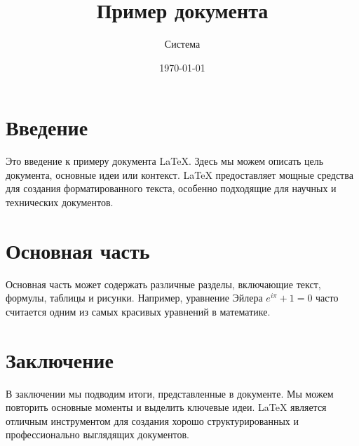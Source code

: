 \documentclass{article}
\title{Пример документа}
\author{Система}
\date{\today}
\begin{document}
\maketitle

\section{Введение}
Это введение к примеру документа \LaTeX. Здесь мы можем описать цель документа, основные идеи или контекст. \LaTeX{} предоставляет мощные средства для создания форматированного текста, особенно подходящие для научных и технических документов.

\section{Основная часть}
Основная часть может содержать различные разделы, включающие текст, формулы, таблицы и рисунки. Например, уравнение Эйлера $e^{i\pi} + 1 = 0$ часто считается одним из самых красивых уравнений в математике.

\section{Заключение}
В заключении мы подводим итоги, представленные в документе. Мы можем повторить основные моменты и выделить ключевые идеи. \LaTeX{} является отличным инструментом для создания хорошо структурированных и профессионально выглядящих документов.
\end{document}
